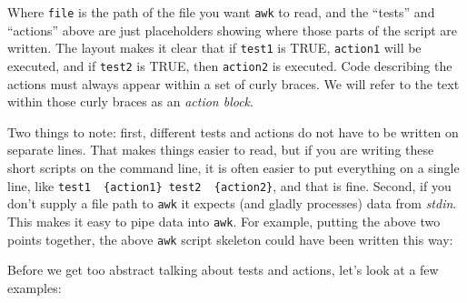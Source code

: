 \documentclass[]{krantz}
\makeatletter
\newenvironment{Shaded}{\begin{snugshade}}{\end{snugshade}}
\newcommand{\ExtensionTok}[1]{#1}
\newcommand{\FunctionTok}[1]{\textcolor[rgb]{0,0,0}{#1}}
\newcommand{\KeywordTok}[1]{\textcolor[rgb]{0.27,0.27,0.27}{\textbf{#1}}}
\newcommand{\NormalTok}[1]{#1}
\newcommand{\StringTok}[1]{\textcolor[rgb]{0.5,0.5,0.5}{#1}}
\newenvironment{kframe}{%
\medskip{}
\setlength{\fboxsep}{.8em}
 \def\at@end@of@kframe{}%
 \ifinner\ifhmode%
  \def\at@end@of@kframe{\end{minipage}}%
  \begin{minipage}{\columnwidth}%
 \fi\fi%
 \def\FrameCommand##1{\hskip\@totalleftmargin \hskip-\fboxsep
 \colorbox{shadecolor}{##1}\hskip-\fboxsep
     \hskip-\linewidth \hskip-\@totalleftmargin \hskip\columnwidth}%
 \MakeFramed {\advance\hsize-\width
   \@totalleftmargin\z@ \linewidth\hsize
   \@setminipage}}%
 {\par\unskip\endMakeFramed%
 \at@end@of@kframe}
\renewenvironment{Shaded}{\begin{kframe}}{\end{kframe}}
\makeatother
\begin{document}
\begin{Shaded}
\end{Shaded}

Where \texttt{file} is the path of the file you want \texttt{awk} to read, and the ``tests'' and ``actions''
above are just placeholders showing where those parts of the script are written. The layout
makes it clear that if \texttt{test1} is TRUE, \texttt{action1} will be executed, and if \texttt{test2} is TRUE, then
\texttt{action2} is executed. Code describing the actions must always appear within a set of
curly braces. We will refer to the text within those curly braces as an \emph{action block}.

Two things to note: first, different tests and actions do not have to be written on separate lines. That makes
things easier to read, but if you are writing these short scripts on the command line, it is often
easier to put everything on a single line, like \texttt{\textquotesingle{}test1\ \ \{action1\}\ test2\ \ \{action2\}}, and that is fine.
Second, if you don't supply a file path to \texttt{awk} it expects (and gladly processes) data from \emph{stdin}.\\
This makes it easy to pipe data into \texttt{awk}. For example, putting the above two points together,
the above \texttt{awk} script skeleton could
have been written this way:

\begin{Shaded}
\begin{Highlighting}[]
\ExtensionTok{%
\end{Highlighting}
\end{Shaded}

Before we get too abstract talking about tests and actions, let's look at a few
examples:
\end{document}
